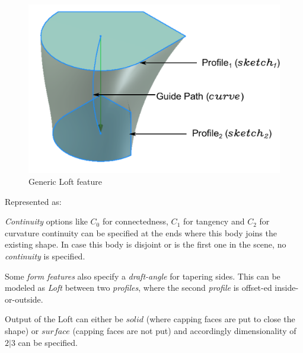\begin{figure}[htbp]

	\includegraphics[scale=0.35]{../Common/images//LoftPreview.pdf} 

\caption{Generic Loft feature}
\label{figure_Loft}
\end{figure}

Represented as:

{\em Continuity} options like $C_0$ for connectedness, $C_1$ for tangency and $C_2$ for curvature continuity can be specified at the ends where this body joins the existing shape. 
In case this body is disjoint or is the first one in the scene, no {\em continuity}  is specified. 

Some {\em form features} also specify a {\em draft-angle}  for tapering sides. This can be modeled as {\em Loft} between two {\em profiles}, where the second {\em profile} is offset-ed inside-or-outside. 

Output of the Loft can either be $solid$ (where capping faces are put to close the shape) or $surface$ (capping faces are not put) and accordingly dimensionality of $2|3$ can be specified.


